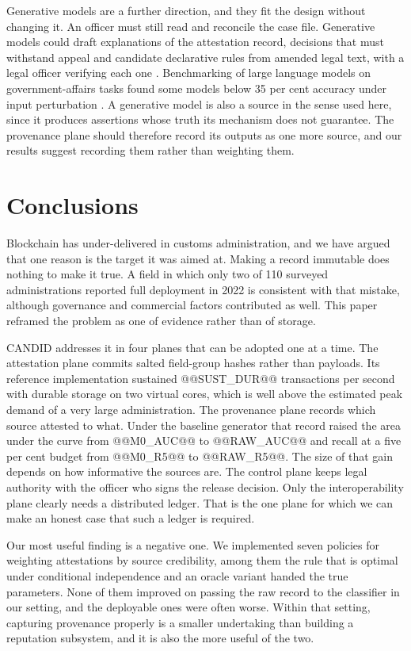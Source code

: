 \documentclass[information,article,submit,moreauthors]{Definitions/mdpi}
\begin{document}
Generative models are a further direction, and they fit the design without changing it. An officer must still read and reconcile the case file. Generative models could draft explanations of the attestation record, decisions that must withstand appeal and candidate declarative rules from amended legal text, with a legal officer verifying each one \cite{micheler2020regtech,governatori2018legal}. Benchmarking of large language models on government-affairs tasks found some models below 35 per cent accuracy under input perturbation \cite{liu2025msgabench}. A generative model is also a source in the sense used here, since it produces assertions whose truth its mechanism does not guarantee. The provenance plane should therefore record its outputs as one more source, and our results suggest recording them rather than weighting them.

\section{Conclusions}\label{sec:conclusion}

Blockchain has under-delivered in customs administration, and we have argued that one reason is the target it was aimed at. Making a record immutable does nothing to make it true. A field in which only two of 110 surveyed administrations reported full deployment in 2022 is consistent with that mistake, although governance and commercial factors contributed as well. This paper reframed the problem as one of evidence rather than of storage.

CANDID addresses it in four planes that can be adopted one at a time. The attestation plane commits salted field-group hashes rather than payloads. Its reference implementation sustained @@SUST_DUR@@ transactions per second with durable storage on two virtual cores, which is well above the estimated peak demand of a very large administration. The provenance plane records which source attested to what. Under the baseline generator that record raised the area under the curve from @@M0_AUC@@ to @@RAW_AUC@@ and recall at a five per cent budget from @@M0_R5@@ to @@RAW_R5@@. The size of that gain depends on how informative the sources are. The control plane keeps legal authority with the officer who signs the release decision. Only the interoperability plane clearly needs a distributed ledger. That is the one plane for which we can make an honest case that such a ledger is required.

Our most useful finding is a negative one. We implemented seven policies for weighting attestations by source credibility, among them the rule that is optimal under conditional independence and an oracle variant handed the true parameters. None of them improved on passing the raw record to the classifier in our setting, and the deployable ones were often worse. Within that setting, capturing provenance properly is a smaller undertaking than building a reputation subsystem, and it is also the more useful of the two.
\end{document}
